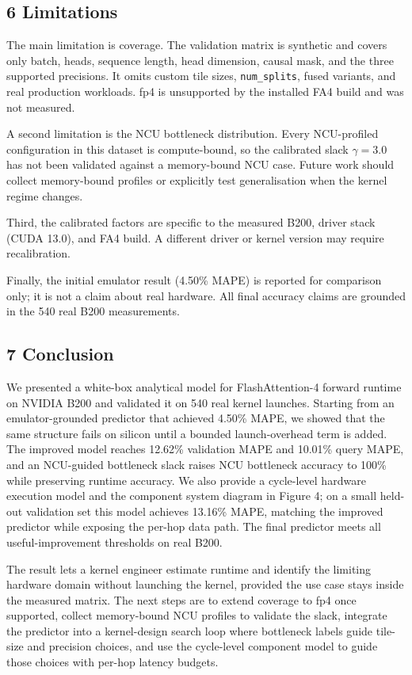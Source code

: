 \subsection{6 Limitations}\label{limitations}

The main limitation is coverage. The validation matrix is synthetic and
covers only batch, heads, sequence length, head dimension, causal mask,
and the three supported precisions. It omits custom tile sizes,
\texttt{num\_splits}, fused variants, and real production workloads. fp4
is unsupported by the installed FA4 build and was not measured.

A second limitation is the NCU bottleneck distribution. Every
NCU-profiled configuration in this dataset is compute-bound, so the
calibrated slack \(\gamma = 3.0\) has not been validated against a
memory-bound NCU case. Future work should collect memory-bound profiles
or explicitly test generalisation when the kernel regime changes.

Third, the calibrated factors are specific to the measured B200, driver
stack (CUDA 13.0), and FA4 build. A different driver or kernel version
may require recalibration.

Finally, the initial emulator result (4.50\% MAPE) is reported for
comparison only; it is not a claim about real hardware. All final
accuracy claims are grounded in the 540 real B200 measurements.

\subsection{7 Conclusion}\label{conclusion}

We presented a white-box analytical model for FlashAttention-4 forward
runtime on NVIDIA B200 and validated it on 540 real kernel launches.
Starting from an emulator-grounded predictor that achieved 4.50\% MAPE,
we showed that the same structure fails on silicon until a bounded
launch-overhead term is added. The improved model reaches 12.62\%
validation MAPE and 10.01\% query MAPE, and an NCU-guided bottleneck
slack raises NCU bottleneck accuracy to 100\% while preserving runtime
accuracy. We also provide a cycle-level hardware execution model and the
component system diagram in Figure 4; on a small held-out validation set
this model achieves 13.16\% MAPE, matching the improved predictor while
exposing the per-hop data path. The final predictor meets all
useful-improvement thresholds on real B200.

The result lets a kernel engineer estimate runtime and identify the
limiting hardware domain without launching the kernel, provided the use
case stays inside the measured matrix. The next steps are to extend
coverage to fp4 once supported, collect memory-bound NCU profiles to
validate the slack, integrate the predictor into a kernel-design search
loop where bottleneck labels guide tile-size and precision choices, and
use the cycle-level component model to guide those choices with per-hop
latency budgets.

